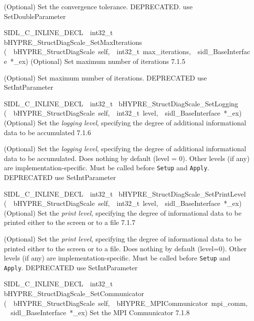 \documentclass{article}
\begin{document}
\begin{cxxentry}
\begin{cxxentry}
\begin{cxxfunction}
\begin{cxxdoc}
(Optional) Set the convergence tolerance.
DEPRECATED.  use SetDoubleParameter
\end{cxxdoc}
\end{cxxfunction}
\begin{cxxfunction}
{SIDL\_C\_INLINE\_DECL\ \ int32\_t\ }
        {bHYPRE\_StructDiagScale\_SetMaxIterations}
        {(\ \ bHYPRE\_StructDiagScale\ self,\ \ int32\_t\ max\_iterations,\ \ sidl\_BaseInterface\ *\_ex)}
        {
(Optional) Set maximum number of iterations}
        {7.1.5}
\begin{cxxdoc}

(Optional) Set maximum number of iterations.
DEPRECATED   use SetIntParameter
\end{cxxdoc}
\end{cxxfunction}
\begin{cxxfunction}
{SIDL\_C\_INLINE\_DECL\ \ int32\_t\ }
        {bHYPRE\_StructDiagScale\_SetLogging}
        {(\ \ bHYPRE\_StructDiagScale\ self,\ \ int32\_t\ level,\ \ sidl\_BaseInterface\ *\_ex)}
        {
(Optional) Set the {\it logging level}, specifying the degree
of additional informational data to be accumulated}
        {7.1.6}
\begin{cxxdoc}

(Optional) Set the {\it logging level}, specifying the degree
of additional informational data to be accumulated.  Does
nothing by default (level = 0).  Other levels (if any) are
implementation-specific.  Must be called before {\tt Setup}
and {\tt Apply}.
DEPRECATED   use SetIntParameter
\end{cxxdoc}
\end{cxxfunction}
\begin{cxxfunction}
{SIDL\_C\_INLINE\_DECL\ \ int32\_t\ }
        {bHYPRE\_StructDiagScale\_SetPrintLevel}
        {(\ \ bHYPRE\_StructDiagScale\ self,\ \ int32\_t\ level,\ \ sidl\_BaseInterface\ *\_ex)}
        {
(Optional) Set the {\it print level}, specifying the degree
of informational data to be printed either to the screen or
to a file}
        {7.1.7}
\begin{cxxdoc}

(Optional) Set the {\it print level}, specifying the degree
of informational data to be printed either to the screen or
to a file.  Does nothing by default (level=0).  Other levels
(if any) are implementation-specific.  Must be called before
{\tt Setup} and {\tt Apply}.
DEPRECATED   use SetIntParameter
\end{cxxdoc}
\end{cxxfunction}
\begin{cxxfunction}
{SIDL\_C\_INLINE\_DECL\ \ int32\_t\ }
        {bHYPRE\_StructDiagScale\_SetCommunicator}
        {(\ \ bHYPRE\_StructDiagScale\ self,\ \ bHYPRE\_MPICommunicator\ mpi\_comm,\ \ sidl\_BaseInterface\ *\_ex)}
        {
Set the MPI Communicator}
        {7.1.8}
\begin{cxxdoc}


\end{cxxdoc}
\end{cxxfunction}
\end{cxxentry}
\end{cxxentry}
\end{document}
